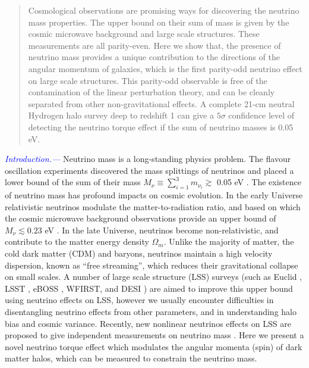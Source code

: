 \documentclass[aps,prd,twocolumn,amsmath,amssymb,amsfont,superscriptaddress]{revtex4-1}
\newcommand{\tcb}{\textcolor{blue}}
\begin{document}
\begin{abstract}
Cosmological observations are promising ways for discovering the neutrino mass properties. The upper bound on their sum of mass is given by the cosmic microwave background and large scale structures. These measurements are all parity-even. 
Here we show that, the presence of neutrino mass provides a unique contribution to the directions of the angular momentum  of galaxies, which is the first parity-odd neutrino effect on large scale structures. This parity-odd observable is free of the contamination of the linear perturbation theory, and can be cleanly separated from other non-gravitational effects. A complete 21-cm neutral Hydrogen halo survey deep to redshift 1 can give a $5\sigma$ confidence level of detecting the neutrino torque effect if the sum of neutrino masses is 0.05 eV.

\end{abstract}

\pacs{}

\maketitle

\tcb{\textit{Introduction.---}}
Neutrino mass is a long-standing physics problem. The flavour oscillation experiments \citep{2002PhRvL..89a1301A} discovered the mass splittings of neutrinos and placed a lower bound of the sum of their mass $M_\nu \equiv \sum_{i=1}^3 m_{\nu_i} \gtrsim$ 0.05 eV \citep{2014ChPhC..38i0001O}. 
The existence of neutrino mass has profound impacts on cosmic evolution. 
In the early Universe relativistic neutrinos modulate the matter-to-radiation ratio, and based on which the cosmic microwave background observations provide an upper bound of $M_\nu\lesssim 0.23$ eV \citep{2016A&A...594A..13P}. 
In the late Universe, neutrinos become non-relativistic, and contribute to the matter energy density $\Omega_m$. 
Unlike the majority of matter, the cold dark matter (CDM) and baryons, neutrinos maintain a high velocity dispersion, known as ``free streaming'', which reduces their gravitational collapse on small scales. A number of large scale structure (LSS) surveys 
(such as Euclid \cite{2011arXiv1110.3193L},
LSST \cite{2009arXiv0912.0201L}, eBOSS \cite{2016AJ....151...44D},
WFIRST\cite{2012SPIE.8442E..1UG}, and DESI \cite{2015AAS...22533605E}) 
are aimed to improve this upper bound using neutrino effects on LSS,
however we usually encounter difficulties in disentangling neutrino effects from other parameters, and in understanding halo bias and cosmic variance.
Recently, new nonlinear neutrinos effects on LSS are proposed to give independent measurements on neutrino mass \citep{2014PhRvL.113m1301Z,2016PhRvL.116n1301Z,2017NatAs...1E.143Y}.
Here we present a novel neutrino torque effect which modulates the angular momenta (spin) of dark matter halos, which can be measured to constrain the neutrino mass.
\end{document}
